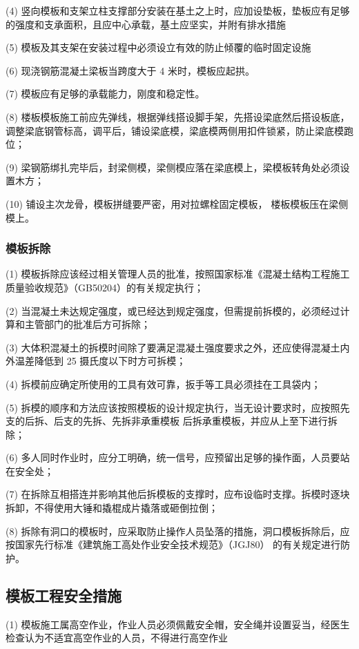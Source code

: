 (4) 竖向模板和支架立柱支撑部分安装在基土之上时，应加设垫板，垫板应有足够的强度和支承面积，且应中心承载，基土应坚实，并附有排水措施

(5) 模板及其支架在安装过程中必须设立有效的防止倾覆的临时固定设施

(6) 现浇钢筋混凝土梁板当跨度大于 4 米时，模板应起拱。

(7) 模板应有足够的承载能力，刚度和稳定性。

(8) 楼板模板施工前应先弹线，根据弹线搭设脚手架，先搭设梁底然后搭设板底，调整梁底钢管标高，调平后，铺设梁底模，梁底模两侧用扣件锁紧，防止梁底模跑位； 

(9) 梁钢筋绑扎完毕后，封梁侧模，梁侧模应落在梁底模上，梁模板转角处必须设置木方； 

(10) 铺设主次龙骨，模板拼缝要严密，用对拉螺栓固定模板， 楼板模板压在梁侧模上。

\subsubsection{模板拆除}

(1) 模板拆除应该经过相关管理人员的批准，按照国家标准《混凝土结构工程施工质量验收规范》（GB50204）的有关规定执行；

(2) 当混凝土未达规定强度，或已经达到规定强度，但需提前拆模的，必须经过计算和主管部门的批准后方可拆除；

(3) 大体积混凝土的拆模时间除了要满足混凝土强度要求之外，还应使得混凝土内外温差降低到 25 摄氏度以下时方可拆模；

(4) 拆模前应确定所使用的工具有效可靠，扳手等工具必须挂在工具袋内；

(5) 拆模的顺序和方法应该按照模板的设计规定执行，当无设计要求时，应按照先支的后拆、后支的先拆、先拆非承重模板
后拆承重模板，并应从上至下进行拆除；

(6) 多人同时作业时，应分工明确，统一信号，应预留出足够的操作面，人员要站在安全处；

(7) 在拆除互相搭连并影响其他后拆模板的支撑时，应布设临时支撑。拆模时逐块拆卸，不得使用大锤和撬棍成片撬落或砸倒拉倒；

(8) 拆除有洞口的模板时，应采取防止操作人员坠落的措施，洞口模板拆除后，应按国家先行标准《建筑施工高处作业安全技术规范》（JGJ80）
的有关规定进行防护。

\subsection{模板工程安全措施}

(1) 模板施工属高空作业，作业人员必须佩戴安全帽，安全绳并设置妥当，经医生检查认为不适宜高空作业的人员，不得进行高空作业

